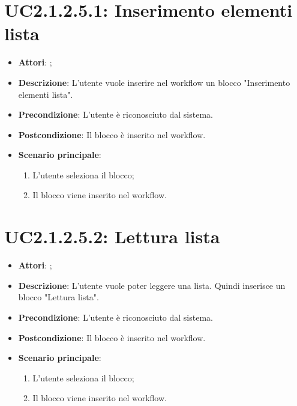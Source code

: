 \section{UC2.1.2.5.1: Inserimento elementi lista}
\label{UC2.1.2.5.1}
\begin{itemize}
	\item \textbf{Attori}: ;
	\item \textbf{Descrizione}: L'utente vuole inserire nel workflow un blocco "Inserimento elementi lista".
	\item \textbf{Precondizione}: L'utente è riconosciuto dal sistema.
	\item \textbf{Postcondizione}: Il blocco è inserito nel workflow.
	\item \textbf{Scenario principale}:
	\begin{enumerate} \item L'utente seleziona il blocco;  \item  Il blocco viene inserito nel workflow.\end{enumerate}
\end{itemize}

\section{UC2.1.2.5.2: Lettura lista}
\label{UC2.1.2.5.2}
\begin{itemize}
	\item \textbf{Attori}: ;
	\item \textbf{Descrizione}: L'utente vuole poter leggere una lista. Quindi inserisce un blocco "Lettura lista".
	\item \textbf{Precondizione}: L'utente è riconosciuto dal sistema.
	\item \textbf{Postcondizione}: Il blocco è inserito nel workflow.
	\item \textbf{Scenario principale}:
	\begin{enumerate} \item L'utente seleziona il blocco;  \item  Il blocco viene inserito nel workflow.\end{enumerate}
\end{itemize}

